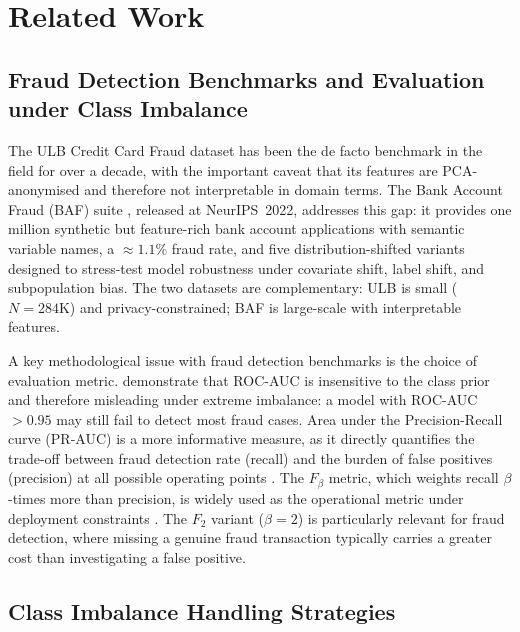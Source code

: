 \documentclass[a4paper,fleqn]{cas-sc}
\begin{document}
\section{Related Work}
\label{sec:relwork}

\subsection{Fraud Detection Benchmarks and Evaluation under Class Imbalance}

The ULB Credit Card Fraud dataset \citep{dalpozzolo2015calibrating, dalpozzolo2017realistic}
has been the de facto benchmark in the field for over a decade, with the important caveat
that its features are PCA-anonymised and therefore not interpretable in domain terms.
The Bank Account Fraud (BAF) suite \citep{jesus2022turning}, released at NeurIPS~2022,
addresses this gap: it provides one million synthetic but feature-rich bank account
applications with semantic variable names, a ${\approx}1.1\%$ fraud rate, and five
distribution-shifted variants designed to stress-test model robustness under covariate
shift, label shift, and subpopulation bias.
The two datasets are complementary: ULB is small ($N\!=\!284\text{K}$) and privacy-constrained;
BAF is large-scale with interpretable features.

A key methodological issue with fraud detection benchmarks is the choice of evaluation
metric.
\citet{saito2015precision} demonstrate that ROC-AUC is insensitive to the class prior
and therefore misleading under extreme imbalance: a model with ROC-AUC~$>0.95$ may
still fail to detect most fraud cases.
Area under the Precision-Recall curve (PR-AUC) is a more informative measure, as it
directly quantifies the trade-off between fraud detection rate (recall) and the burden
of false positives (precision) at all possible operating points
\citep{saito2015precision, dalpozzolo2017realistic}.
The $F_\beta$ metric, which weights recall $\beta$-times more than precision, is widely
used as the operational metric under deployment constraints \citep{rymantubb2018survey}.
The $F_2$ variant ($\beta\!=\!2$) is particularly relevant for fraud detection, where
missing a genuine fraud transaction typically carries a greater cost than investigating
a false positive.

\subsection{Class Imbalance Handling Strategies}
\end{document}
